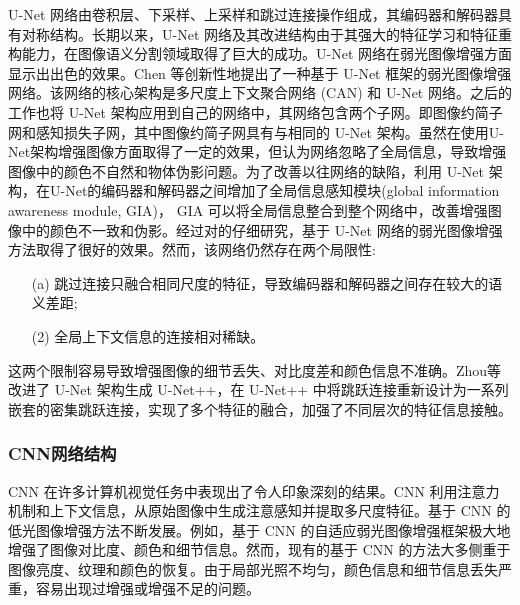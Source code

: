 \documentclass[a4paper]{ctexart}
\begin{document}
	U-Net 网络由卷积层、下采样、上采样和跳过连接操作组成，其编码器和解码器具有对称结构。长期以来，U-Net 网络及其改进结构由于其强大的特征学习和特征重构能力，在图像语义分割领域取得了巨大的成功。U-Net 网络在弱光图像增强方面显示出出色的效果。Chen 等\cite{chen2018learning}创新性地提出了一种基于 U-Net 框架的弱光图像增强网络。该网络的核心架构是多尺度上下文聚合网络 (CAN) 和 U-Net 网络。之后的工作\cite{chen2018learning, zamir2021learning}也将 U-Net 架构应用到自己的网络中，其网络包含两个子网。即图像约简子网和感知损失子网，其中图像约简子网具有与\cite{chen2018learning}相同的 U-Net 架构。虽然\cite{chen2018learning, zamir2021learning}在使用U-Net架构增强图像方面取得了一定的效果，但\cite{meng2020gia}认为\cite{chen2018learning, zamir2021learning}网络忽略了全局信息，导致增强图像中的颜色不自然和物体伪影问题。为了改善以往网络的缺陷，利用 U-Net 架构，\cite{meng2020gia}在U-Net的编码器和解码器之间增加了全局信息感知模块(global information awareness module, GIA)， GIA 可以将全局信息整合到整个网络中，改善增强图像中的颜色不一致和伪影。经过对\cite{chen2018learning, meng2020gia, zamir2021learning}的仔细研究，基于 U-Net 网络的弱光图像增强方法取得了很好的效果。然而，该网络仍然存在两个局限性:
	
	\begin{itemize}
		\item[(a)] 
		跳过连接只融合相同尺度的特征，导致编码器和解码器之间存在较大的语义差距;
		
		\item[(2)]
		全局上下文信息的连接相对稀缺。
	\end{itemize}	
	
	这两个限制容易导致增强图像的细节丢失、对比度差和颜色信息不准确。Zhou等\cite{zhou2018unet++,zhou2019unet++}改进了 U-Net 架构生成 U-Net++，在 U-Net++ 中将跳跃连接重新设计为一系列嵌套的密集跳跃连接，实现了多个特征的融合，加强了不同层次的特征信息接触。
	
	\subsubsection{CNN网络结构}
	
	CNN 在许多计算机视觉任务中表现出了令人印象深刻的结果。CNN 利用注意力机制\cite{yang2021locally, zhang2020attention}和上下文信息，从原始图像中生成注意感知并提取多尺度特征\cite{li2018multi,zamir2020learning}。基于 CNN 的低光图像增强方法不断发展。例如，基于 CNN 的自适应弱光图像增强框架\cite{li2020visual}极大地增强了图像对比度、颜色和细节信息。然而，现有的基于 CNN 的方法大多侧重于图像亮度、纹理和颜色的恢复\cite{xu2020learning}。由于局部光照不均匀，颜色信息和细节信息丢失严重，容易出现过增强或增强不足的问题。
	
\end{document}
